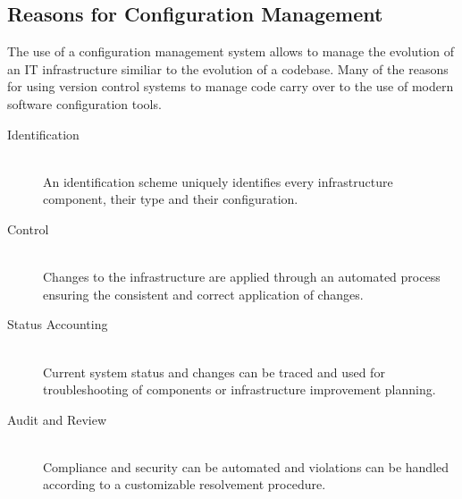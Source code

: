 \subsection{Reasons for Configuration Management}

The use of a configuration management system allows to manage the evolution of an IT infrastructure similiar to the evolution of a codebase. Many of the reasons for using version control systems to manage code \cite{Dart:1991:CCM:111062.111063}\cite{1983ansi} carry over to the use of modern software configuration tools.

\begin{description}
	
	\item[Identification] \hfill \\ 
	An identification scheme uniquely identifies every infrastructure component, their type and their configuration. 
	
	\item[Control] \hfill \\
	Changes to the infrastructure are applied through an automated process
	ensuring the consistent and correct application of changes.
	
	\item[Status Accounting]  \hfill \\
	Current system status and changes can be traced and used for troubleshooting of components or infrastructure improvement planning.
	
	\item[Audit and Review] \hfill \\
	Compliance and security can be automated and violations can be handled according to a customizable resolvement procedure.  
	
\end{description}
